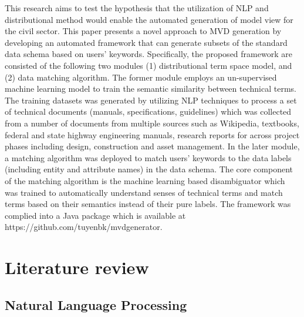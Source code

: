 \documentclass[Journal, InsideFigs, DoubleSpace]{ascelike} %
\begin{document}
This research aims to test the hypothesis that the utilization of NLP and distributional method would enable the automated generation of model view for the civil sector. This paper presents a novel approach to MVD generation by developing an automated framework that can generate subsets of the standard data schema based on users' keywords. Specifically, the proposed framework are consisted of the following two modules (1) distributional term space model, and (2) data matching algorithm. The former module employs an un-supervised machine learning model to train the semantic similarity between technical terms. The training datasets was generated by utilizing NLP techniques to process a set of technical documents (manuals, specifications, guidelines) which was collected from a number of documents from multiple sources such as Wikipedia, textbooks, federal and state highway engineering manuals, research reports for across project phases including design, construction and asset management. In the later module, a matching algorithm was deployed to match users' keywords to the data labels (including entity and attribute names) in the data schema. The core component of the matching algorithm is the machine learning based disambiguator which was trained to automatically understand senses of technical terms and match terms based on their semantics instead of their pure labels. The framework was complied into a Java package which is available at https://github.com/tuyenbk/mvdgenerator.
%
\section{Literature review} \label{sec:litrev} %

\subsection{Natural Language Processing}
\end{document}
